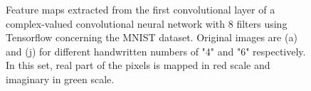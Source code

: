 \begin{figure}
\begin{minipage}{\linewidth}
{			\label{fig:6featcxy6}
		}
		\caption{Feature maps extracted from the first convolutional layer of a complex-valued convolutional neural network with 8 filters using Tensorflow concerning the MNIST dataset. Original images are (a) and (j) for different handwritten numbers of "4" and "6" respectively. In this set, real part of the pixels is mapped in red scale and imaginary in green scale.}
		\label{fig:featscxy}
	\end{minipage}
	

\end{figure}
